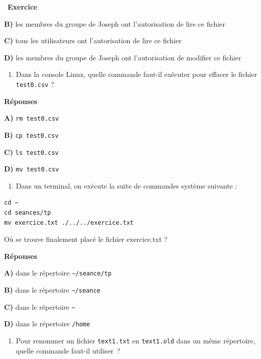 \documentclass[
  11pt,
]{article}
\providecommand{\tightlist}{%
  \setlength{\itemsep}{0pt}\setlength{\parskip}{0pt}}
\newcounter{exo}
\newenvironment{exercice}[1]
{\par \medskip   \addtocounter{exo}{1} \noindent  
\begin{bclogo}[arrondi =0.1,   noborder = true, logo=\bccrayon, marge=4]{~\textbf{Exercice} \textbf{\theexo} {\itshape #1} }  \par}
{
\end{bclogo}
 \par \bigskip }
\newcounter{def}
\begin{document}
\begin{exercice}{}
\textbf{B)} les membres du groupe de Joseph ont l'autorisation de lire
ce fichier

\textbf{C)} tous les utilisateurs ont l'autorisation de lire ce fichier

\textbf{D)} les membres du groupe de Joseph ont l'autorisation de
modifier ce fichier

\begin{enumerate}
\def\labelenumi{\arabic{enumi}.}
\setcounter{enumi}{3}
\tightlist
\item
  Dans la console Linux, quelle commande faut-il exécuter pour effacer
  le fichier \texttt{test0.csv} ?
\end{enumerate}

\textbf{Réponses}

\textbf{A)} \texttt{rm\ test0.csv}

\textbf{B)} \texttt{cp\ test0.csv}

\textbf{C)} \texttt{ls\ test0.csv}

\textbf{D)} \texttt{mv\ test0.csv}

\begin{enumerate}
\def\labelenumi{\arabic{enumi}.}
\setcounter{enumi}{4}
\tightlist
\item
  Dans un terminal, on exécute la suite de commandes système suivante :
\end{enumerate}

\begin{verbatim}
cd ~
cd seances/tp
mv exercice.txt ./../../exercice.txt
\end{verbatim}

Où se trouve finalement placé le fichier exercice.txt ?

\textbf{Réponses}

\textbf{A)} dans le répertoire \texttt{\textasciitilde{}/seance/tp}

\textbf{B)} dans le répertoire \texttt{\textasciitilde{}/seance}

\textbf{C)} dans le répertoire \texttt{\textasciitilde{}}

\textbf{D)} dans le répertoire \texttt{/home}

\begin{enumerate}
\def\labelenumi{\arabic{enumi}.}
\setcounter{enumi}{5}
\tightlist
\item
  Pour renommer un fichier \texttt{text1.txt} en \texttt{text1.old} dans
  un même répertoire, quelle commande faut-il utiliser~?
\end{enumerate}


\end{exercice}
\end{document}
